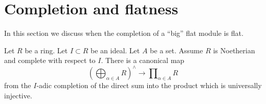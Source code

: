 \section{Completion and flatness}
\label{section-completion-flat}

\noindent
In this section we discuss when the completion of a ``big'' flat module
is flat.

\begin{lemma}
\label{lemma-ui-completion-direct-sum-into-product}
Let $R$ be a ring.
Let $I \subset R$ be an ideal.
Let $A$ be a set.
Assume $R$ is Noetherian and complete with respect to $I$. There is a
canonical map
$$
\left(\bigoplus\nolimits_{\alpha \in A} R\right)^\wedge
\longrightarrow
\prod\nolimits_{\alpha \in A} R
$$
from the $I$-adic completion of the direct sum into the product
which is universally injective.
\end{lemma}

